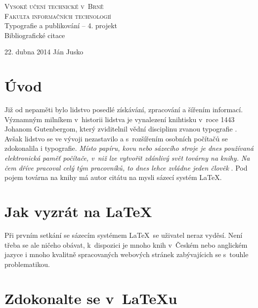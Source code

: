 \documentclass[a4paper,11pt,titlepage]{article}
\begin{document}
\begin{titlepage}
\begin{center}
	\Huge
	\textsc{Vysoké učení technické v~Brně\\
	\huge Fakulta informačních technologií}\\
{ \LARGE Typografie a publikování -- 4. projekt\\
\Huge Bibliografické citace\\}
\end{center}
{\Large 22. dubna 2014 \hfill
Ján Jusko}
\end{titlepage}


\section{Úvod}

Již od nepaměti bylo lidstvo posedlé získávání, zpracování a šířením informací. Významným milníkem v~historii lidstva je vynalezení knihtisku v~roce 1443 Johanom Gutenbergom, který zviditelnil vědní disciplinu zvanou typografie \cite{Springer:Gutenberg_bible}.
Avšak lidstvo se ve vývoji nezastavilo a s~rozšířením osobních počítačů se zdokonalila i typografie.
\emph{Místo papíru, kovu nebo sázecího stroje je dnes používaná elektronická paměť počítače, v~niž lze vytvořit zdánlivý svět továrny na knihy. Na čem dříve pracoval celý tým pracovníků, to dnes lehce zvládne jeden člověk} \cite{Rybicka:Latex_pro_zacatecniky}.
Pod pojem továrna na knihy má autor citátu na mysli sázecí systém \LaTeX.

\section{Jak vyzrát na \LaTeX}

Při prvním setkání se sázecím systémem \LaTeX \  se uživatel neraz vyděsí. Není třeba se ale ničeho obávat, k~dispozici je mnoho knih v~Českém \cite{Rybicka:Latex_pro_zacatecniky} nebo anglickém \cite{Bringhurst:The_Elements} jazyce i mnoho kvalitně spracovaných webových stránek \cite{Martinek:Latex} \cite{Pecina:Typomil} \cite{Benes:Uvod} zabývajícich se s~touhle problematikou.

\section{Zdokonalte se v~\LaTeX u}
\end{document}
